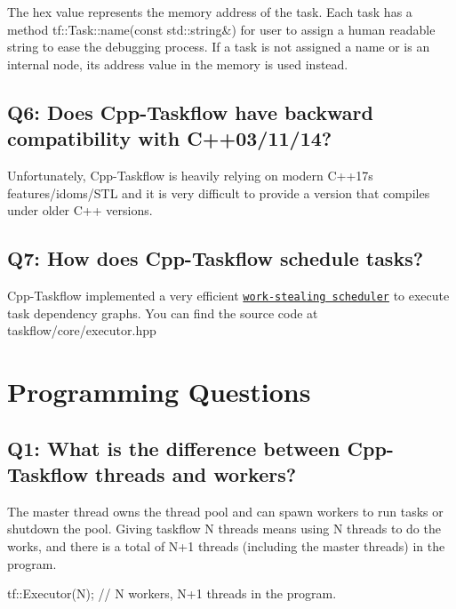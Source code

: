 The hex value represents the memory address of the task. Each task has a method tf\+::\+Task\+::name(const std\+::string\&) for user to assign a human readable string to ease the debugging process. If a task is not assigned a name or is an internal node, its address value in the memory is used instead.\hypertarget{_f_a_q_GeneralQuestion6}{}\subsection{Q6\+: Does Cpp-\/\+Taskflow have backward compatibility with C++03/11/14?}\label{_f_a_q_GeneralQuestion6}
Unfortunately, Cpp-\/\+Taskflow is heavily relying on modern C++17\textquotesingle{}s features/idoms/\+S\+TL and it is very difficult to provide a version that compiles under older C++ versions.\hypertarget{_f_a_q_GeneralQuestion7}{}\subsection{Q7\+: How does Cpp-\/\+Taskflow schedule tasks?}\label{_f_a_q_GeneralQuestion7}
Cpp-\/\+Taskflow implemented a very efficient \href{https://en.wikipedia.org/wiki/Work_stealing}{\tt work-\/stealing scheduler} to execute task dependency graphs. You can find the source code at {\ttfamily taskflow/core/executor.\+hpp} 

\hypertarget{_f_a_q_ProgrammingQuestions}{}\section{Programming Questions}\label{_f_a_q_ProgrammingQuestions}
\hypertarget{_f_a_q_ProgrammingQuestions1}{}\subsection{Q1\+: What is the difference between Cpp-\/\+Taskflow threads and workers?}\label{_f_a_q_ProgrammingQuestions1}
The master thread owns the thread pool and can spawn workers to run tasks or shutdown the pool. Giving taskflow {\ttfamily N} threads means using {\ttfamily N} threads to do the works, and there is a total of {\ttfamily N+1} threads (including the master threads) in the program.


\begin{DoxyCode}
tf::Executor(N);    \textcolor{comment}{// N workers, N+1 threads in the program.}
\end{DoxyCode}



